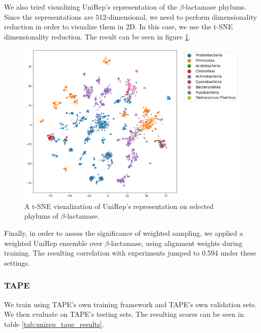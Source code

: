 We also tried visualizing UniRep's representation of the $\beta$-lactamase phylums. Since the representations are 512-dimensional, we need to perform dimensionality reduction in order to visualize them in 2D. In this case, we use the t-SNE \cite{maaten2008visualizing} dimensionality reduction. The result can be seen in figure \ref{fig:unirep_tsne}.

\begin{figure}[H]
    \centering
    \includegraphics[width = \linewidth]{report/figures/unirep_tsne.png}
    \caption{A t-SNE visualization of UniRep's representation on selected phylums of $\beta$-lactamase.}
    \label{fig:unirep_tsne}
\end{figure}

Finally, in order to assess the significance of weighted sampling, we applied a weighted UniRep ensemble over $\beta$-lactamase, using alignment weights during training. The resulting correlation with experiments jumped to 0.594 under these settings.

\subsubsection{TAPE}
We train using TAPE's own training framework and TAPE's own validation sets. We then evaluate on TAPE's testing sets. The resulting scores can be seen in table \ref{tab:unirep_tape_results}.

